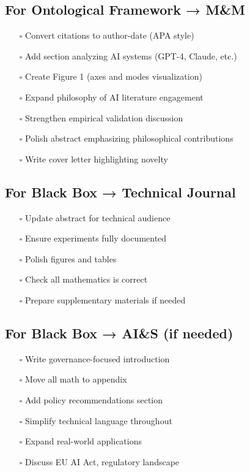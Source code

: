 \documentclass[12pt]{article}
\begin{document}
\subsection*{For Ontological Framework → M\&M}

\begin{enumerate}[itemsep=0pt]
\item[$\square$] Convert citations to author-date (APA style)
\item[$\square$] Add section analyzing AI systems (GPT-4, Claude, etc.)
\item[$\square$] Create Figure 1 (axes and modes visualization)
\item[$\square$] Expand philosophy of AI literature engagement
\item[$\square$] Strengthen empirical validation discussion
\item[$\square$] Polish abstract emphasizing philosophical contributions
\item[$\square$] Write cover letter highlighting novelty
\end{enumerate}

\subsection*{For Black Box → Technical Journal}

\begin{enumerate}[itemsep=0pt]
\item[$\square$] Update abstract for technical audience
\item[$\square$] Ensure experiments fully documented
\item[$\square$] Polish figures and tables
\item[$\square$] Check all mathematics is correct
\item[$\square$] Prepare supplementary materials if needed
\end{enumerate}

\subsection*{For Black Box → AI\&S (if needed)}

\begin{enumerate}[itemsep=0pt]
\item[$\square$] Write governance-focused introduction
\item[$\square$] Move all math to appendix
\item[$\square$] Add policy recommendations section
\item[$\square$] Simplify technical language throughout
\item[$\square$] Expand real-world applications
\item[$\square$] Discuss EU AI Act, regulatory landscape
\end{enumerate}
\end{document}
